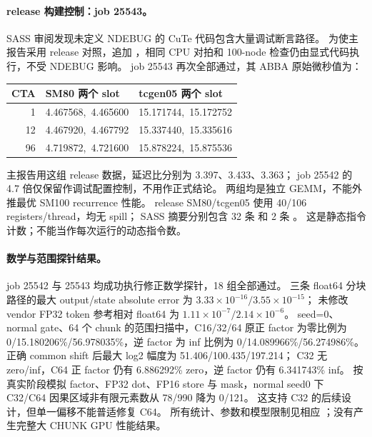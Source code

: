\paragraph{release 构建控制：job 25543。}
SASS 审阅发现未定义 NDEBUG 的 CuTe 代码包含大量调试断言路径。
为使主报告采用 release 对照，追加 ，相同 CPU 对拍和
100-node 检查仍由显式代码执行，不受 NDEBUG 影响。
job 25543 再次全部通过，其 ABBA 原始微秒值为：
\begin{center}\small
\begin{tabular}{@{}rll@{}}\toprule
CTA&SM80 两个 slot&tcgen05 两个 slot\\\midrule
1&4.467568,\ 4.465600&15.171744,\ 15.172752\\
12&4.467920,\ 4.467792&15.337440,\ 15.335616\\
96&4.719872,\ 4.721600&15.878224,\ 15.875536\\\bottomrule
\end{tabular}
\end{center}
主报告用这组 release 数据，延迟比分别为 3.397、3.433、3.363；
job 25542 的 4.7 倍仅保留作调试配置控制，不用作正式结论。
两组均是独立 GEMM，不能外推最优 SM100 recurrence 性能。
release SM80/tcgen05 使用 40/106 registers/thread，均无 spill；
SASS 摘要分别包含 32 条  和 2 条 。
这是静态指令计数；不能当作每次运行的动态指令数。

\paragraph{数学与范围探针结果。}
job 25542 与 25543 均成功执行修正数学探针，18 组全部通过。
三条 float64 分块路径的最大 output/state absolute error 为
$3.33\times10^{-16}/3.55\times10^{-15}$；
未修改 vendor FP32 token 参考相对 float64 为
$1.11\times10^{-7}/2.14\times10^{-6}$。
seed=0、normal gate、64 个 chunk 的范围扫描中，C16/32/64 原正 factor
为零比例为 0/15.180206\%/56.978035\%，逆 factor 为 inf 比例为
0/14.089966\%/56.274986\%。
正确 common shift 后最大 log2 幅度为 51.406/100.435/197.214；
C32 无 zero/inf，C64 正 factor 仍有 6.886292\% zero，逆 factor 仍有 6.341743\% inf。
按真实阶段模拟 factor、FP32 dot、FP16 store 与 mask，normal seed0 下 C32/C64
因果区域非有限元素数从 78/990 降为 0/121。
这支持 C32 的后续设计，但单一偏移不能普适修复 C64。
所有统计、参数和模型限制见相应 ；没有产生完整大 CHUNK GPU
性能结果。

